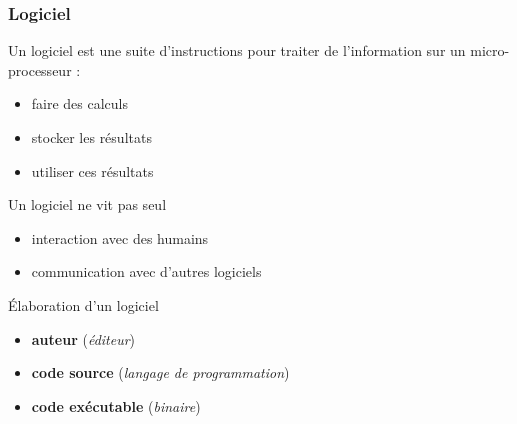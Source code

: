 \documentclass[10pt]{beamer}
\begin{document}

\begin{frame}
  \frametitle{Logiciel}

  \begin{definition}
    Un logiciel est une suite d'instructions pour traiter de l'information sur
    un micro-processeur :
    \begin{itemize}
    \item faire des calculs
    \item stocker les résultats
    \item utiliser ces résultats
    \end{itemize}
  \end{definition}

  \vfill

  Un logiciel ne vit pas seul
  
  \begin{itemize}
  \item interaction avec des humains
  \item communication avec d'autres logiciels
  \end{itemize}

  \vfill

  Élaboration d'un logiciel

  \begin{itemize}
  \item \textbf{auteur} \dotfill{} (\emph{éditeur})
  \item \textbf{code source} \dotfill{}  (\emph{langage de programmation})
  \item \textbf{code exécutable} \dotfill{} (\emph{binaire})
  \end{itemize}

  \vfill\null
\end{frame}

\end{document}
